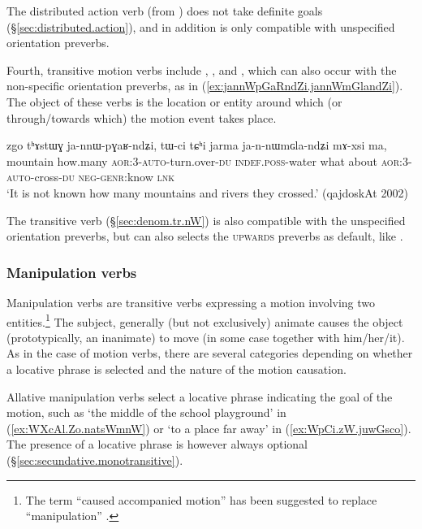 The distributed action verb  (from ) does not take definite goals (§\ref{sec:distributed.action}), and in addition is only compatible with unspecified orientation preverbs.

Fourth, transitive motion verbs include , ,  and , which can also occur with the non-specific orientation preverbs, as in (\ref{ex:jannWpGaRndZi.jannWmGlandZi}). The object of these verbs is the location or entity around which (or through/towards which) the motion event takes place.
 
\begin{exe}
\ex \label{ex:jannWpGaRndZi.jannWmGlandZi}
\gll  zgo tʰɤstɯɣ ja-nnɯ-pɣaʁ-ndʑi, tɯ-ci tɕʰi jarma ja-n-nɯmɢla-ndʑi mɤ-xsi ma, \\
 mountain how.many \textsc{aor}:3\flobv{}-\textsc{auto}-turn.over-\textsc{du} \textsc{indef}.\textsc{poss}-water what about \textsc{aor}:3\flobv{}-\textsc{auto}-cross-\textsc{du} \textsc{neg}-\textsc{genr}:know \textsc{lnk} \\
\glt `It is not known how many mountains and rivers they crossed.'  (qajdoskAt 2002)
\end{exe}  

The transitive verb  (§\ref{sec:denom.tr.nW}) is also compatible with the unspecified orientation preverbs, but can also selects the \textsc{upwards} preverbs as default, like .

\subsubsection{Manipulation verbs} \label{sec:manipulation.verbs}
Manipulation verbs are transitive verbs expressing a motion involving two entities.\footnote{The term ``caused accompanied motion'' has been suggested to replace ``manipulation'' \citep{margetts19bring}. } The subject, generally (but not exclusively) animate causes the object (prototypically, an inanimate) to move (in some case together with him/her/it). As in the case of motion verbs, there are several categories depending on whether a locative phrase is selected and the nature of the motion causation.

Allative manipulation verbs select a locative phrase indicating the goal of the motion, such as  `the middle of the school playground' in (\ref{ex:WXcAl.Zo.natsWmnW}) or  `to a place far away' in (\ref{ex:WpCi.zW.juwGsco}). The presence of a locative phrase is however always optional (§\ref{sec:secundative.monotransitive}).

